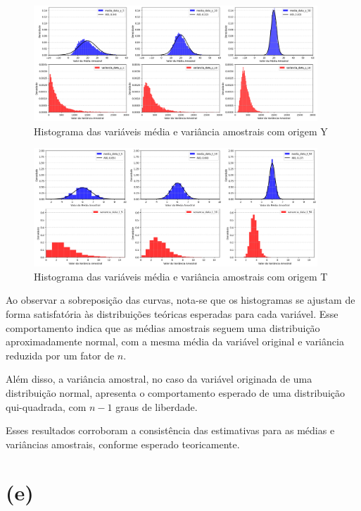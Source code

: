 \documentclass[]{abntex2}
\begin{document}
\begin{figure}
    \centering 
    \includegraphics[width=0.95\textwidth]{imgs/medvarY.png}
    \caption{Histograma das variáveis média e variância amostrais  com origem Y}
    \label{fig:medvarY} %
\end{figure}

\begin{figure}
    \centering 
    \includegraphics[width=0.95\textwidth]{imgs/medvarT.png}
    \caption{Histograma das variáveis média e variância amostrais com origem T}
    \label{fig:medvarT} %
\end{figure}

Ao observar a sobreposição das curvas, nota-se que os histogramas se ajustam de forma satisfatória às distribuições teóricas esperadas para cada variável. 
Esse comportamento indica que as médias amostrais seguem uma distribuição aproximadamente normal, com a mesma média da variável original e variância reduzida por um fator de \( n \).

Além disso, a variância amostral, no caso da variável originada de uma distribuição normal, apresenta o comportamento esperado de uma distribuição qui-quadrada, com \( n - 1 \) graus de liberdade.

Esses resultados corroboram a consistência das estimativas para as médias e variâncias amostrais, conforme esperado teoricamente.

\section*{\textbf{(e)}}
\end{document}
